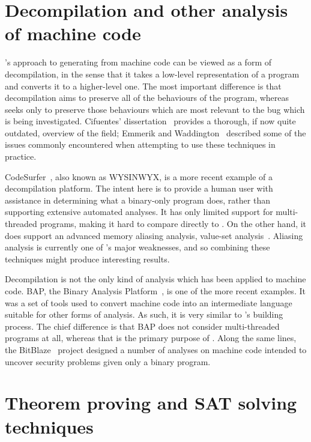 \section{Decompilation and other analysis of machine code}

{\Technique}'s approach to generating {\StateMachines} from machine
code can be viewed as a form of decompilation, in the sense that it
takes a low-level representation of a program and converts it to a
higher-level one.  The most important difference is that decompilation
aims to preserve all of the behaviours of the program, whereas
{\technique} seeks only to preserve those behaviours which are most
relevant to the bug which is being investigated.  Cifuentes'
dissertation~\cite{Cifuentes1994} provides a thorough, if now quite
outdated, overview of the field; Emmerik and
Waddington~\cite{Emmerik2004} described some of the issues commonly
encountered when attempting to use these techniques in practice.

CodeSurfer~\cite{Balakrishnan2008,Balakrishnan2005a}, also known as
WYSINWYX, is a more recent example of a decompilation platform.  The
intent here is to provide a human user with assistance in determining
what a binary-only program does, rather than supporting extensive
automated analyses.  It has only limited support for multi-threaded
programs, making it hard to compare directly to {\technique}.  On the
other hand, it does support an advanced memory aliasing analysis,
value-set analysis~\cite{Balakrishnan2004}.  Aliasing analysis is
currently one of {\technique}'s major weaknesses, and so combining
these techniques might produce interesting results.

Decompilation is not the only kind of analysis which has been applied
to machine code.  BAP, the Binary Analysis
Platform~\cite{Brumley2011}, is one of the more recent examples.  It
was a set of tools used to convert machine code into an intermediate
language suitable for other forms of analysis.  As such, it is very
similar to {\technique}'s {\StateMachine} building process.  The chief
difference is that BAP does not consider multi-threaded programs at
all, whereas that is the primary purpose of {\technique}.  Along the
same lines, the BitBlaze~\cite{Song2008} project designed a number of
analyses on machine code intended to uncover security problems given
only a binary program.  

\section{Theorem proving and SAT solving techniques}

